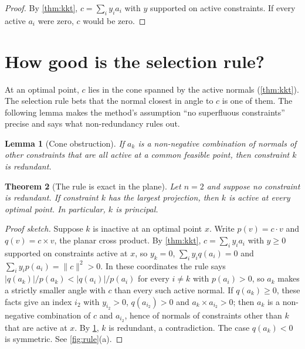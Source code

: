 \documentclass[11pt,a4paper]{article}
\theoremstyle{plain}
\newtheorem{theorem}{Theorem}
\newtheorem{lemma}[theorem]{Lemma}
\theoremstyle{definition}
\theoremstyle{remark}
\begin{document}
\begin{proof}
By \cref{thm:kkt}, $c=\sum_i y_ia_i$ with $y$ supported on active constraints. If every active
$a_i$ were zero, $c$ would be zero.
\end{proof}

\section{How good is the selection rule?}\label{sec:rule}

At an optimal point, $c$ lies in the cone spanned by the active normals (\cref{thm:kkt}). The
selection rule bets that the normal closest in angle to $c$ is one of them. The following
lemma makes the method's assumption ``no superfluous constraints''~\cite{grishin2008} precise
and says what non-redundancy rules out.

\begin{lemma}[Cone obstruction]\label{lem:cone}
If $a_k$ is a non-negative combination of normals of \emph{other} constraints that are all active
at a common feasible point, then constraint $k$ is redundant.
\end{lemma}

\begin{theorem}[The rule is exact in the plane]\label{thm:plane}
Let $n=2$ and suppose no constraint is redundant. If constraint $k$ has the largest projection,
then $k$ is active at every optimal point. In particular, $k$ is principal.
\end{theorem}

\begin{proof}[Proof sketch]
Suppose $k$ is inactive at an optimal point $x$. Write $p(v)=c\cdot v$ and $q(v)=c\times v$,
the planar cross product. By \cref{thm:kkt}, $c=\sum_i y_ia_i$ with $y\ge0$ supported on
constraints active at $x$, so $y_k=0$, $\sum_i y_i q(a_i)=0$ and $\sum_i y_ip(a_i)=\|c\|^2>0$.
In these coordinates the rule says $|q(a_k)|/p(a_k)<|q(a_i)|/p(a_i)$ for every $i\ne k$ with
$p(a_i)>0$, so $a_k$ makes a strictly smaller angle with $c$ than every such active normal.
If $q(a_k)\ge0$, these facts give an index $i_2$ with $y_{i_2}>0$, $q(a_{i_2})>0$ and
$a_k\times a_{i_2}>0$; then $a_k$ is a non-negative combination of $c$ and $a_{i_2}$, hence of
normals of constraints other than $k$ that are active at $x$. By \cref{lem:cone}, $k$ is
redundant, a contradiction. The case $q(a_k)<0$ is symmetric. See \cref{fig:rule}(a).
\end{proof}
\end{document}
